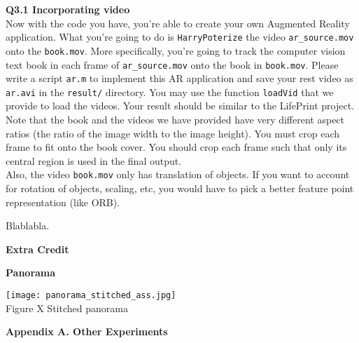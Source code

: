 \documentclass[12pt,letterpaper, onecolumn]{exam}
\begin{document}
\begin{questions}
    \question \textbf{Q3.1 Incorporating video}\\
    Now with the code you have, you're able to create your own Augmented Reality application. What you're going to do is \texttt{HarryPoterize} the video \texttt{ar\_source.mov} onto the \texttt{book.mov}. More specifically, you're going to track the computer vision text book in each frame of \texttt{ar\_source.mov} onto the book in \texttt{book.mov}. Please write a script \texttt{ar.m} to implement this AR application and save your rest video as \texttt{ar.avi} in the \texttt{result/} directory. You may use the function \texttt{loadVid} that we provide to load the videos. Your result should be similar to the LifePrint project. \\
    Note that the book and the videos we have provided have very different aspect ratios (the ratio of the image width to the image height). You must crop each frame to fit onto the book cover. You should crop each frame such that only its central region is used in the final output. \\
    Also, the video \texttt{book.mov} only has translation of objects. If you want to account for rotation of objects, scaling, etc, you would have to pick a better feature point representation (like ORB).

    \begin{solution}
        Blablabla.
    \end{solution}

    \pagebreak 
    \begingroup
    \large \textbf{Extra Credit}
    \endgroup

    \question \textbf{Panorama}

    \begin{solution}
        \begin{center}
            \texttt{[image: panorama\_stitched\_ass.jpg]} \\
            Figure X Stitched panorama
        \end{center}
    \end{solution}

    \pagebreak 
    \begingroup
    \large \textbf{Appendix A. Other Experiments}\\
    \endgroup


\end{questions}
\end{document}
